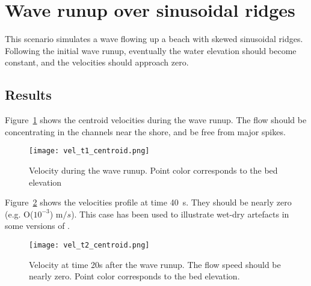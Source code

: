 \section{Wave runup over sinusoidal ridges}
This scenario simulates a wave flowing up a beach with skewed sinusoidal ridges. Following the initial wave runup, eventually the water elevation should become constant, and the velocities should approach zero. 

\subsection{Results}
Figure~\ref{fig:vel_t1_centroid} shows the centroid velocities during the wave runup. The flow should be concentrating in the channels near the shore, and be free from major spikes.

\begin{figure}
\begin{center}
\texttt{[image: vel\_t1\_centroid.png]}
\caption{Velocity during the wave runup. Point color corresponds to the bed elevation}
\label{fig:vel_t1_centroid}
\end{center}
\end{figure}

Figure~\ref{fig:vel_t2_centroid} shows the velocities profile at time 40~s. They should be nearly zero (e.g. O($10^{-3}$) m$/s$). This case has been used to illustrate wet-dry artefacts in some versions of \anuga.

\begin{figure}
\begin{center}
\texttt{[image: vel\_t2\_centroid.png]}
\caption{Velocity at time 20s after the wave runup. The flow speed should be nearly zero. Point color corresponds to the bed elevation.}
\label{fig:vel_t2_centroid}
\end{center}
\end{figure}

\endinput
